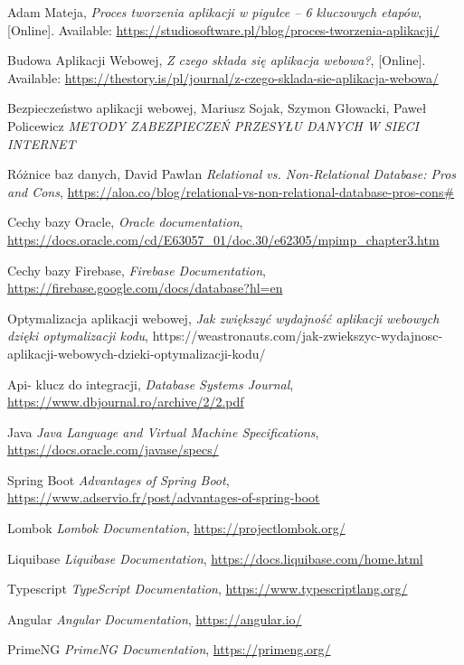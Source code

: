 \begin{thebibliography}{99}
\small

Adam Mateja, \emph{Proces tworzenia aplikacji w pigułce – 6 kluczowych etapów}, [Online]. Available: \url{https://studiosoftware.pl/blog/proces-tworzenia-aplikacji/}

Budowa Aplikacji Webowej, \emph{Z czego składa się aplikacja webowa?}, [Online]. Available: \url{https://thestory.is/pl/journal/z-czego-sklada-sie-aplikacja-webowa/}

Bezpieczeństwo aplikacji webowej,  Mariusz Sojak, Szymon Głowacki, Paweł Policewicz \emph{METODY ZABEZPIECZEŃ PRZESYŁU DANYCH
W SIECI INTERNET}

Różnice baz danych, David Pawlan \emph{Relational vs. Non-Relational Database: Pros and Cons}, \url{https://aloa.co/blog/relational-vs-non-relational-database-pros-cons#}

Cechy bazy Oracle, \emph{Oracle documentation}, \url{https://docs.oracle.com/cd/E63057_01/doc.30/e62305/mpimp_chapter3.htm}

Cechy bazy Firebase, \emph{Firebase Documentation}, \url{https://firebase.google.com/docs/database?hl=en}

Optymalizacja aplikacji webowej, \emph{Jak zwiększyć wydajność aplikacji webowych dzięki optymalizacji kodu}, https://weastronauts.com/jak-zwiekszyc-wydajnosc-aplikacji-webowych-dzieki-optymalizacji-kodu/

Api- klucz do integracji, \emph{Database Systems Journal}, \url{https://www.dbjournal.ro/archive/2/2.pdf}

Java \emph{Java Language and Virtual Machine Specifications},
\url{https://docs.oracle.com/javase/specs/}

Spring Boot \emph{Advantages of Spring Boot}, \url{https://www.adservio.fr/post/advantages-of-spring-boot}

Lombok \emph{Lombok Documentation}, \url{https://projectlombok.org/}

Liquibase \emph{Liquibase Documentation}, \url{https://docs.liquibase.com/home.html}

Typescript \emph{TypeScript Documentation}, \url{https://www.typescriptlang.org/}

Angular \emph{Angular Documentation}, \url{https://angular.io/}

PrimeNG \emph{PrimeNG Documentation}, \url{https://primeng.org/}


\end{thebibliography}
